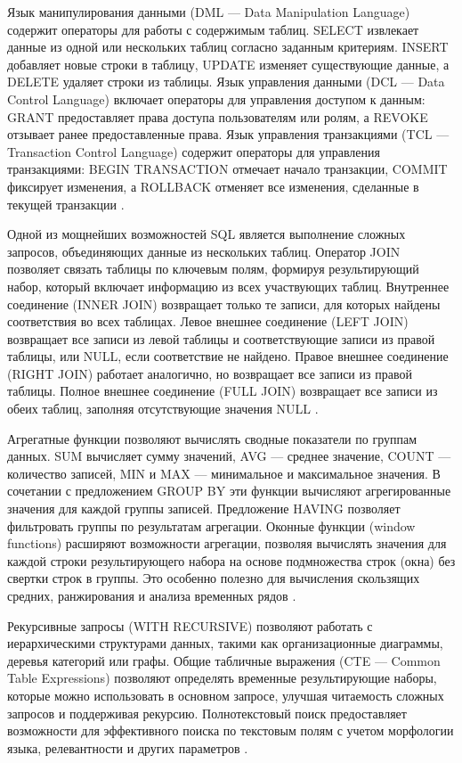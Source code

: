 \documentclass{SibFU-docs}
\begin{document}
Язык манипулирования данными (DML — Data Manipulation Language) содержит операторы для работы с содержимым таблиц. SELECT извлекает данные из одной или нескольких таблиц согласно заданным критериям. INSERT добавляет новые строки в таблицу, UPDATE изменяет существующие данные, а DELETE удаляет строки из таблицы. Язык управления данными (DCL — Data Control Language) включает операторы для управления доступом к данным: GRANT предоставляет права доступа пользователям или ролям, а REVOKE отзывает ранее предоставленные права. Язык управления транзакциями (TCL — Transaction Control Language) содержит операторы для управления транзакциями: BEGIN TRANSACTION отмечает начало транзакции, COMMIT фиксирует изменения, а ROLLBACK отменяет все изменения, сделанные в текущей транзакции \cite{elmasri2016}.


Одной из мощнейших возможностей SQL является выполнение сложных запросов, объединяющих данные из нескольких таблиц. Оператор JOIN позволяет связать таблицы по ключевым полям, формируя результирующий набор, который включает информацию из всех участвующих таблиц. Внутреннее соединение (INNER JOIN) возвращает только те записи, для которых найдены соответствия во всех таблицах. Левое внешнее соединение (LEFT JOIN) возвращает все записи из левой таблицы и соответствующие записи из правой таблицы, или NULL, если соответствие не найдено. Правое внешнее соединение (RIGHT JOIN) работает аналогично, но возвращает все записи из правой таблицы. Полное внешнее соединение (FULL JOIN) возвращает все записи из обеих таблиц, заполняя отсутствующие значения NULL \cite{date2003}.

Агрегатные функции позволяют вычислять сводные показатели по группам данных. SUM вычисляет сумму значений, AVG — среднее значение, COUNT — количество записей, MIN и MAX — минимальное и максимальное значения. В сочетании с предложением GROUP BY эти функции вычисляют агрегированные значения для каждой группы записей. Предложение HAVING позволяет фильтровать группы по результатам агрегации. Оконные функции (window functions) расширяют возможности агрегации, позволяя вычислять значения для каждой строки результирующего набора на основе подмножества строк (окна) без свертки строк в группы. Это особенно полезно для вычисления скользящих средних, ранжирования и анализа временных рядов \cite{date2003}.

Рекурсивные запросы (WITH RECURSIVE) позволяют работать с иерархическими структурами данных, такими как организационные диаграммы, деревья категорий или графы. Общие табличные выражения (CTE — Common Table Expressions) позволяют определять временные результирующие наборы, которые можно использовать в основном запросе, улучшая читаемость сложных запросов и поддерживая рекурсию. Полнотекстовый поиск предоставляет возможности для эффективного поиска по текстовым полям с учетом морфологии языка, релевантности и других параметров \cite{postgresqldocs}.
\end{document}

